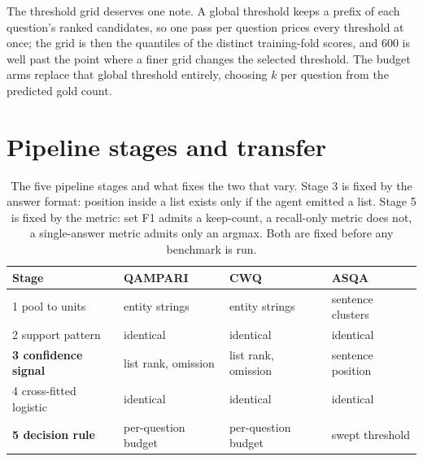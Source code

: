 \documentclass{article}
\begin{document}
The threshold grid deserves one note. A global threshold keeps a prefix of each question's ranked candidates, so one pass per question prices every threshold at once; the grid is then the quantiles of the distinct training-fold scores, and 600 is well past the point where a finer grid changes the selected threshold. The budget arms replace that global threshold entirely, choosing $k$ per question from the predicted gold count.

\section{Pipeline stages and transfer}
\label{app:proc}

\begin{table}[h]
  \caption{The five pipeline stages and what fixes the two that vary. Stage 3 is fixed by the answer format: position inside a list exists only if the agent emitted a list. Stage 5 is fixed by the metric: set F1 admits a keep-count, a recall-only metric does not, a single-answer metric admits only an argmax. Both are fixed before any benchmark is run.}
  \label{tab:slots}
  \centering
  \begin{tabular}{llll}
    \toprule
    Stage & QAMPARI & CWQ & ASQA \\
    \midrule
    1 pool to units       & entity strings   & entity strings & sentence clusters  \\
    2 support pattern     & identical        & identical      & identical          \\
    \textbf{3 confidence signal} & list rank, omission & list rank, omission & sentence position \\
    4 cross-fitted logistic & identical      & identical      & identical          \\
    \textbf{5 decision rule}     & per-question budget & per-question budget & swept threshold \\
    \bottomrule
  \end{tabular}
\end{table}
\end{document}
